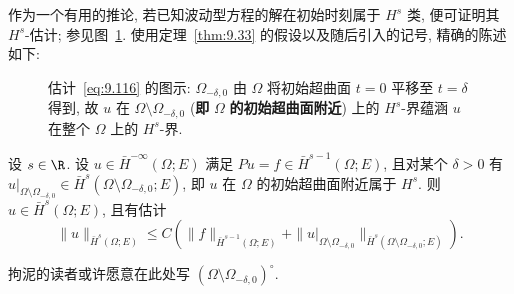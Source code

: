 作为一个有用的推论, 若已知波动型方程的解在初始时刻属于 $H^s$ 类, 便可证明其 $H^s$-估计; 参见图~\ref{fig:9.5}. 使用定理~\ref{thm:9.33} 的假设以及随后引入的记号, 精确的陈述如下:

\begin{figure}[htbp]
\centering
\drawFigNineFive
\caption{估计~\eqref{eq:9.116} 的图示: $\Omega_{-\delta,0}$ 由 $\Omega$ 将初始超曲面 $t = 0$ 平移至 $t = \delta$ 得到, 故 $u$ 在 $\Omega \setminus \Omega_{-\delta,0}$ (\textbf{即} $\Omega$ \textbf{的初始超曲面附近}) 上的 $H^s$-界蕴涵 $u$ 在整个 $\Omega$ 上的 $H^s$-界.}\label{fig:9.5}
\end{figure}

\begin{corollary}[延拓估计]\label{cor:9.38}
设 $s \in \R$. 设 $u \in \bar{H}^{-\infty}(\Omega; E)$ 满足 $P u = f \in \bar{H}^{s-1}(\Omega; E)$, 且对某个 $\delta > 0$ 有 $u|_{\Omega \setminus \Omega_{-\delta,0}} \in \bar{H}^s(\Omega \setminus \Omega_{-\delta,0}; E)$, 即 $u$ 在 $\Omega$ 的初始超曲面附近属于 $H^s$. 则 $u \in \bar{H}^s(\Omega; E)$, 且有估计
\begin{equation}\label{eq:9.116}
    \|u\|_{\bar{H}^s(\Omega; E)} \le C \left( \|f\|_{\bar{H}^{s-1}(\Omega; E)} + \|u|_{\Omega \setminus \Omega_{-\delta,0}}\|_{\bar{H}^s(\Omega \setminus \Omega_{-\delta,0}; E)} \right).
\end{equation}
\end{corollary}

拘泥的读者或许愿意在此处写 $(\Omega \setminus \Omega_{-\delta,0})^\circ$.

